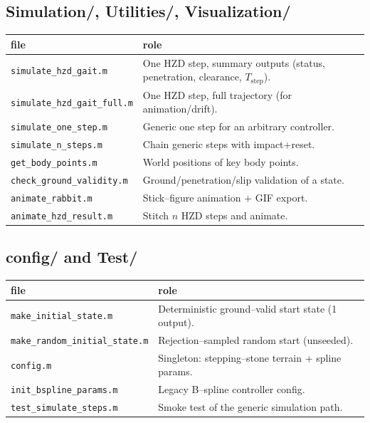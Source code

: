 \documentclass[11pt,a4paper]{article}
\newcommand{\fname}[1]{\texttt{#1}}          %
\begin{document}
\subsection*{Simulation/, Utilities/, Visualization/}
\begin{longtable}{@{}L{4.7cm} L{9.5cm}@{}}
\toprule file & role \\ \midrule \endhead
\fname{simulate\_hzd\_gait.m} & One HZD step, summary outputs (status, penetration, clearance, $T_{\text{step}}$). \\
\fname{simulate\_hzd\_gait\_full.m} & One HZD step, full trajectory (for animation/drift). \\
\fname{simulate\_one\_step.m} & Generic one step for an arbitrary controller. \\
\fname{simulate\_n\_steps.m} & Chain generic steps with impact+reset. \\
\fname{get\_body\_points.m} & World positions of key body points. \\
\fname{check\_ground\_validity.m} & Ground/penetration/slip validation of a state. \\
\fname{animate\_rabbit.m} & Stick--figure animation + GIF export. \\
\fname{animate\_hzd\_result.m} & Stitch $n$ HZD steps and animate. \\
\bottomrule
\end{longtable}

\subsection*{config/ and Test/}
\begin{longtable}{@{}L{4.7cm} L{9.5cm}@{}}
\toprule file & role \\ \midrule \endhead
\fname{make\_initial\_state.m} & Deterministic ground--valid start state (1 output). \\
\fname{make\_random\_initial\_state.m} & Rejection--sampled random start (unseeded). \\
\fname{config.m} & Singleton: stepping--stone terrain + spline params. \\
\fname{init\_bspline\_params.m} & Legacy B--spline controller config. \\
\fname{test\_simulate\_steps.m} & Smoke test of the generic simulation path. \\
\bottomrule
\end{longtable}

\end{document}
